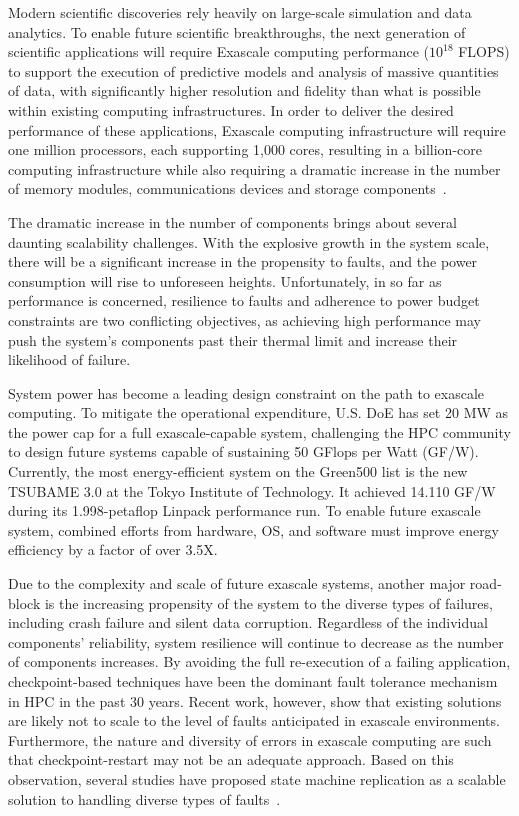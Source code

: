 Modern scientific discoveries rely heavily on large-scale
simulation and data analytics. To enable future scientific breakthroughs, the next generation of scientific applications will require
Exascale computing performance ($10^{18}$ FLOPS) to support the execution of predictive models and analysis of massive quantities of
data, with significantly higher resolution and fidelity than what is possible within existing computing infrastructures. 
In order to deliver the desired performance of these applications, Exascale computing infrastructure will require one million processors, each supporting 1,000 cores, resulting in a billion-core computing infrastructure while also requiring a dramatic increase in the number of memory modules, communications devices and storage components~\cite{Bergman08exascalecomputing}.

The dramatic increase in the number of components brings about several daunting scalability challenges. With the explosive growth in the system scale, there will be a significant increase in the propensity to faults, and the power consumption will rise to unforeseen heights. Unfortunately, in so far as performance is concerned,
resilience to faults and adherence to power budget constraints are two conflicting objectives, as achieving high
performance may push the system’s components past their thermal limit and increase their likelihood of failure. 

System power has become a leading design constraint on the path to exascale computing. To mitigate the operational expenditure, U.S. DoE has set 20 MW  as the power cap for a full exascale-capable system, challenging the HPC community to design future systems capable of sustaining 50 GFlops
per Watt (GF/W). Currently, the most energy-efficient system on the Green500 list is the new TSUBAME 3.0 at the Tokyo Institute of Technology. It achieved 14.110 GF/W during its 1.998-petaflop Linpack performance run. To enable future exascale system, combined efforts from hardware, OS, and software must improve energy efficiency by a factor of over 3.5X.

Due to the complexity and scale of future exascale systems, another major road-block is the increasing propensity of the system to the diverse types of failures, including crash failure and silent data corruption. Regardless of the individual components’ reliability, system resilience will continue to decrease as the number of components increases. By avoiding the full re-execution of a failing application, checkpoint-based techniques have been the dominant fault tolerance mechanism in HPC in the past 30 years. Recent work, however, show that existing solutions are likely not to scale to the level of faults anticipated in exascale environments. Furthermore, the nature and diversity of errors in exascale computing are such that checkpoint-restart may not be an adequate approach. Based on this observation, several studies have proposed state machine replication as a scalable solution to handling diverse types of faults~\cite{fiala2012detection,ferreira2011evaluating}. 

